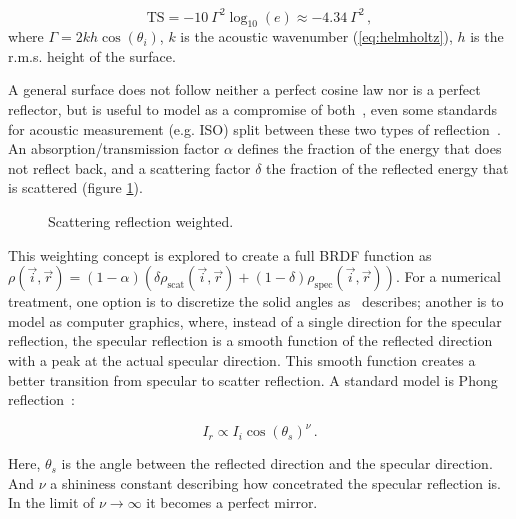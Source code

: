 \begin{equation*}
\text{TS} = -10~\Gamma^2\log_{10}(e) \approx -4.34~\Gamma^2\,,
\end{equation*}
%
where $\Gamma = 2kh\cos(\theta_i)$, $k$ is the acoustic wavenumber
(\ref{eq:helmholtz}), $h$ is the r.m.s. height of the surface.

A general surface does not follow neither a perfect cosine law nor is a perfect
reflector, but is useful to model as a compromise of
both~\cite{cox2006tutorial,vorlander2000definition}, even some standards for
acoustic measurement (e.g. ISO) split between these two types of reflection~\cite{rindel2001scattering}. An absorption/transmission factor
$\alpha$ defines the fraction of the energy that does not reflect back, and a scattering
factor $\delta$ the fraction of the reflected energy that is scattered (figure
\ref{fig:scatter}).

\begin{figure}[h]
	\centering
	
	\caption{Scattering reflection weighted.}
	\label{fig:scatter}
\end{figure}

This weighting concept is explored to create a full BRDF function as
$\rho(\vec{i},\vec{r}) = (1-\alpha)(\delta \rho_\text{scat}(\vec{i},\vec{r}) +
(1-\delta) \rho_\text{spec}(\vec{i},\vec{r}) )$. For a numerical treatment, one
option is to discretize the solid angles as~\citet{siltanen2007room} describes;
another is to model as computer graphics, where, instead of a single direction
for the specular reflection, the specular reflection is a smooth function of the
reflected direction with a peak at the actual specular direction. This smooth
function creates a better transition from specular to scatter reflection. A
standard model is Phong reflection~\cite{phong1975illumination}:

\begin{equation}
\label{eq:phong}
I_r \propto	 I_i \cos(\theta_s)^\nu\,.
\end{equation} 

Here, $\theta_s$ is the angle between the reflected direction and the specular
direction. And $\nu$ a shininess constant describing how concetrated the
specular reflection is. In the limit of $\nu \to \infty$ it becomes a perfect mirror.


